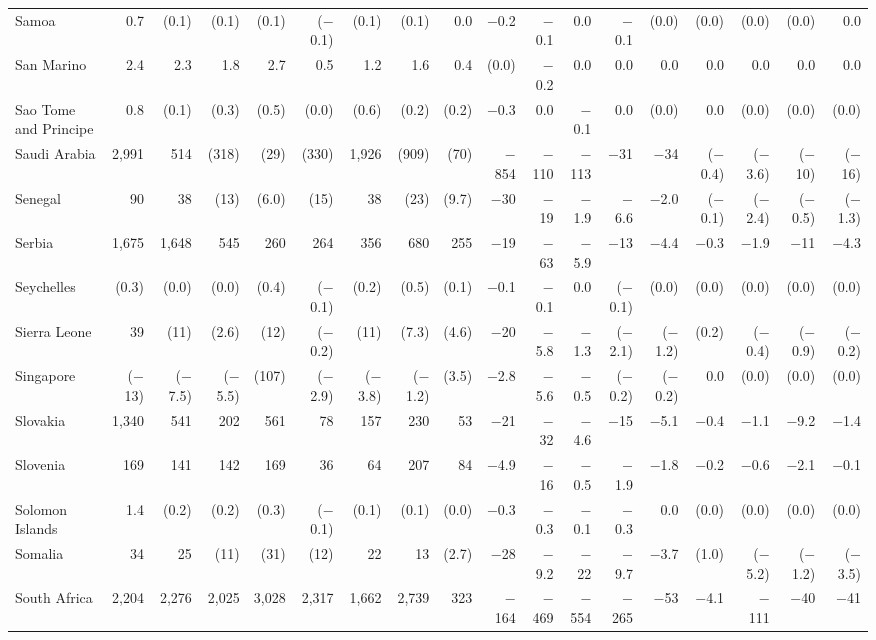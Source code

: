 \begin{longtable}{lrrrrrrrrrrrrrrrrr}
Samoa & 0.7 & (0.1) & (0.1) & (0.1) & ($-$0.1) & (0.1) & (0.1) & 0.0 & $-$0.2 & $-$0.1 & 0.0 & $-$0.1 & (0.0) & (0.0) & (0.0) & (0.0) & 0.0 \\
San Marino & 2.4 & 2.3 & 1.8 & 2.7 & 0.5 & 1.2 & 1.6 & 0.4 & (0.0) & $-$0.2 & 0.0 & 0.0 & 0.0 & 0.0 & 0.0 & 0.0 & 0.0 \\
Sao Tome and Principe & 0.8 & (0.1) & (0.3) & (0.5) & (0.0) & (0.6) & (0.2) & (0.2) & $-$0.3 & 0.0 & $-$0.1 & 0.0 & (0.0) & 0.0 & (0.0) & (0.0) & (0.0) \\
Saudi Arabia & 2,991 & 514 & (318) & (29) & (330) & 1,926 & (909) & (70) & $-$854 & $-$110 & $-$113 & $-$31 & $-$34 & ($-$0.4) & ($-$3.6) & ($-$10) & ($-$16) \\
Senegal & 90 & 38 & (13) & (6.0) & (15) & 38 & (23) & (9.7) & $-$30 & $-$19 & $-$1.9 & $-$6.6 & $-$2.0 & ($-$0.1) & ($-$2.4) & ($-$0.5) & ($-$1.3) \\
Serbia & 1,675 & 1,648 & 545 & 260 & 264 & 356 & 680 & 255 & $-$19 & $-$63 & $-$5.9 & $-$13 & $-$4.4 & $-$0.3 & $-$1.9 & $-$11 & $-$4.3 \\
Seychelles & (0.3) & (0.0) & (0.0) & (0.4) & ($-$0.1) & (0.2) & (0.5) & (0.1) & $-$0.1 & $-$0.1 & 0.0 & ($-$0.1) & (0.0) & (0.0) & (0.0) & (0.0) & (0.0) \\
Sierra Leone & 39 & (11) & (2.6) & (12) & ($-$0.2) & (11) & (7.3) & (4.6) & $-$20 & $-$5.8 & $-$1.3 & ($-$2.1) & ($-$1.2) & (0.2) & ($-$0.4) & ($-$0.9) & ($-$0.2) \\
Singapore & ($-$13) & ($-$7.5) & ($-$5.5) & (107) & ($-$2.9) & ($-$3.8) & ($-$1.2) & (3.5) & $-$2.8 & $-$5.6 & $-$0.5 & ($-$0.2) & ($-$0.2) & 0.0 & (0.0) & (0.0) & (0.0) \\
Slovakia & 1,340 & 541 & 202 & 561 & 78 & 157 & 230 & 53 & $-$21 & $-$32 & $-$4.6 & $-$15 & $-$5.1 & $-$0.4 & $-$1.1 & $-$9.2 & $-$1.4 \\
Slovenia & 169 & 141 & 142 & 169 & 36 & 64 & 207 & 84 & $-$4.9 & $-$16 & $-$0.5 & $-$1.9 & $-$1.8 & $-$0.2 & $-$0.6 & $-$2.1 & $-$0.1 \\
Solomon Islands & 1.4 & (0.2) & (0.2) & (0.3) & ($-$0.1) & (0.1) & (0.1) & (0.0) & $-$0.3 & $-$0.3 & $-$0.1 & $-$0.3 & 0.0 & (0.0) & (0.0) & (0.0) & (0.0) \\
Somalia & 34 & 25 & (11) & (31) & (12) & 22 & 13 & (2.7) & $-$28 & $-$9.2 & $-$22 & $-$9.7 & $-$3.7 & (1.0) & ($-$5.2) & ($-$1.2) & ($-$3.5) \\
South Africa & 2,204 & 2,276 & 2,025 & 3,028 & 2,317 & 1,662 & 2,739 & 323 & $-$164 & $-$469 & $-$554 & $-$265 & $-$53 & $-$4.1 & $-$111 & $-$40 & $-$41 \\

\end{longtable}
